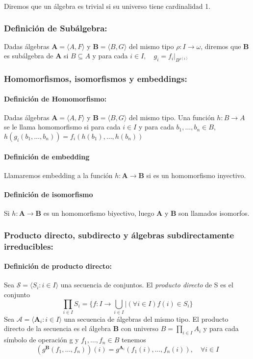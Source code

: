\documentclass{article}
\begin{document}
Diremos que un álgebra es trivial si su universo tiene cardinalidad 1.
\subsubsection{Definición de Subálgebra:}
Dadas álgebras $\textbf{A} = \langle A, F \rangle$ y $\textbf{B} = \langle B, G \rangle$ del mismo tipo $\rho \colon I \to \omega$, diremos que \textbf{B} es subálgebra de \textbf{A} si $B \subseteq A$ y para cada $i \in I, \quad g_i = f_i|_{B^{\rho(i)}}$ 
\subsubsection{Homomorfismos, isomorfismos y embeddings:}
\paragraph{Definición de Homomorfismo:}
Dadas álgebras $\textbf{A} = \langle A, F \rangle$ y $\textbf{B} = \langle B, G \rangle$ del mismo tipo. Una función $h \colon B \to A$ se le llama homomorfismo si para cada $i \in I$ y para cada $b_1, \dots, b_n \in B$, $h(g_i(b_1, \dots, b_n)) = f_i(h(b_1), \dots, h(b_n))$
\paragraph{Definición de embedding}
Llamaremos embedding a la función $h \colon \textbf{A} \to \textbf{B}$ si es un homomorfismo inyectivo.
\paragraph{Definición de isomorfismo}
Si $h \colon \textbf{A} \to \textbf{B}$ es un homomorfismo biyectivo, luego \textbf{A} y \textbf{B} son llamados isomorfos. 
\subsubsection{Producto directo, subdirecto y álgebras subdirectamente irreducibles:}
\paragraph{Definición de producto directo:}
Sea $\mathcal{S} = \langle S_i \colon i \in I \rangle$ una secuencia de conjuntos. El \textit{producto directo} de S es el conjunto 
\[ \prod_{i \in I} S_i = \{ f \colon I \to \bigcup_{i \in I} |(\forall i \in I) f(i) \in S_i\} \]
Sea $\mathcal{A} = \langle \textbf{A}_i \colon i \in I \rangle$ una secuencia de álgebras del mismo tipo. El producto directo de la secuencia es el álgebra \textbf{B} con universo $B = \prod_{i \in I} A_i$ y para cada símbolo de operación g y $f_1, \dots , f_n \in B$ tenemos 
\[ (g^{\textbf{B}} (f_1,\dots, f_n))(i) = g^{\textbf{A}_i}(f_1(i),\dots, f_n(i)), \quad \forall i \in I\]
\end{document}
